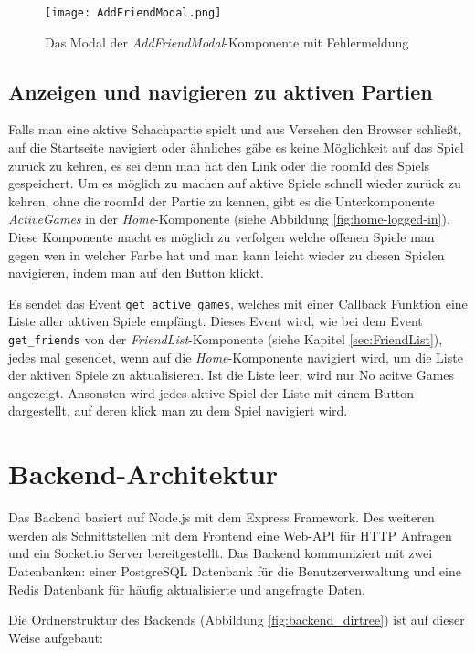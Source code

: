 \begin{figure}[h]
\centering
\texttt{[image: AddFriendModal.png]}
\caption{Das Modal der \textit{AddFriendModal}-Komponente mit Fehlermeldung}
\label{fig:AddFriendModal}
\end{figure}

\subsection{Anzeigen und navigieren zu aktiven Partien}
Falls man eine aktive Schachpartie spielt und aus Versehen den Browser schließt, auf die Startseite navigiert oder ähnliches gäbe es keine Möglichkeit auf das Spiel zurück zu kehren, es sei denn man hat den Link oder die roomId des Spiels gespeichert. Um es möglich zu machen auf aktive Spiele schnell wieder zurück zu kehren, ohne die roomId der Partie zu kennen, gibt es die Unterkomponente \textit{ActiveGames} in der \textit{Home}-Komponente (siehe Abbildung \ref{fig:home-logged-in}). Diese Komponente macht es möglich zu verfolgen welche offenen Spiele man gegen wen in welcher Farbe hat und man kann leicht wieder zu diesen Spielen navigieren, indem man auf den Button klickt.

Es sendet das Event \verb|get_active_games|, welches mit einer Callback Funktion  eine Liste aller aktiven Spiele empfängt. Dieses Event wird, wie bei dem Event \verb|get_friends| von der \textit{FriendList}-Komponente (siehe Kapitel \ref{sec:FriendList}), jedes mal gesendet, wenn auf die \textit{Home}-Komponente navigiert wird, um die Liste der aktiven Spiele zu aktualisieren.
Ist die Liste leer, wird nur \glqq No acitve Games\grqq{ } angezeigt. Ansonsten wird jedes aktive Spiel der Liste mit einem Button dargestellt, auf deren klick man zu dem Spiel navigiert wird.

        \section{Backend-Architektur}
Das Backend basiert auf Node.js mit dem Express Framework. Des weiteren werden als Schnittstellen mit dem Frontend eine Web-API für HTTP Anfragen und ein Socket.io Server bereitgestellt. Das Backend kommuniziert mit zwei Datenbanken: einer PostgreSQL Datenbank für die Benutzerverwaltung und eine Redis Datenbank für häufig aktualisierte und angefragte Daten.

Die Ordnerstruktur des Backends (Abbildung \ref{fig:backend_dirtree}) ist auf dieser Weise aufgebaut:

